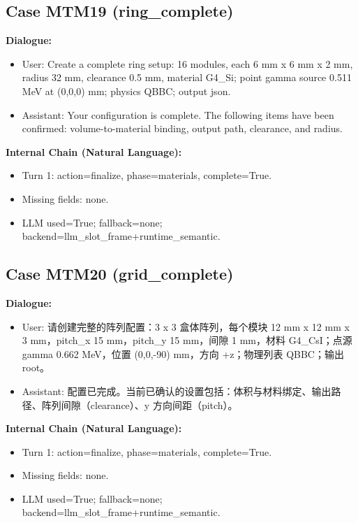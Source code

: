 \documentclass[11pt]{ctexart}
\begin{document}
\subsection{Case MTM19 (ring\_complete)}
\textbf{Dialogue:}
\begin{itemize}
\item User: Create a complete ring setup: 16 modules, each 6 mm x 6 mm x 2 mm, radius 32 mm, clearance 0.5 mm, material G4\_Si; point gamma source 0.511 MeV at (0,0,0) mm; physics QBBC; output json.
\item Assistant: Your configuration is complete. The following items have been confirmed: volume-to-material binding, output path, clearance, and radius.
\end{itemize}
\textbf{Internal Chain (Natural Language):}
\begin{itemize}
\item Turn 1: action=finalize, phase=materials, complete=True.
\item Missing fields: none.
\item LLM used=True; fallback=none; backend=llm\_slot\_frame+runtime\_semantic.
\end{itemize}
\subsection{Case MTM20 (grid\_complete)}
\textbf{Dialogue:}
\begin{itemize}
\item User: 请创建完整的阵列配置：3 x 3 盒体阵列，每个模块 12 mm x 12 mm x 3 mm，pitch\_x 15 mm，pitch\_y 15 mm，间隙 1 mm，材料 G4\_CsI；点源 gamma 0.662 MeV，位置 (0,0,-90) mm，方向 +z；物理列表 QBBC；输出 root。
\item Assistant: 配置已完成。当前已确认的设置包括：体积与材料绑定、输出路径、阵列间隙（clearance）、y 方向间距（pitch）。
\end{itemize}
\textbf{Internal Chain (Natural Language):}
\begin{itemize}
\item Turn 1: action=finalize, phase=materials, complete=True.
\item Missing fields: none.
\item LLM used=True; fallback=none; backend=llm\_slot\_frame+runtime\_semantic.
\end{itemize}
\end{document}
